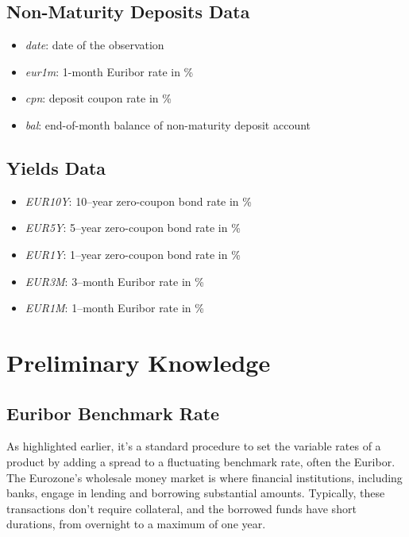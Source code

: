 \documentclass[11pt]{report}
\begin{document}
\section{Non-Maturity Deposits Data}


\begin{itemize}
	\item \textit{date}: date of the observation
	\item \textit{eur1m}: 1-month Euribor rate in \%
	\item \textit{cpn}: deposit coupon rate in \%
	\item \textit{bal}: end-of-month balance of non-maturity deposit account
\end{itemize}


\section{Yields Data}

\begin{itemize}
	\item \textit{EUR10Y}: 10--year zero-coupon bond rate in \%
	\item \textit{EUR5Y}: 5--year zero-coupon bond rate in \%
	\item \textit{EUR1Y}: 1--year zero-coupon bond rate in \%
	\item \textit{EUR3M}: 3--month Euribor rate in \%
	\item \textit{EUR1M}: 1--month Euribor rate in \%
\end{itemize}




\chapter{Preliminary Knowledge}

\section{Euribor Benchmark Rate}

As highlighted earlier, it's a standard procedure to set the variable rates of a product by adding a spread to a fluctuating benchmark rate, often the Euribor.\\

The Eurozone's wholesale money market is where financial institutions, including banks, engage in lending and borrowing substantial amounts. Typically, these transactions don't require collateral, and the borrowed funds have short durations, from overnight to a maximum of one year.\\
\end{document}
